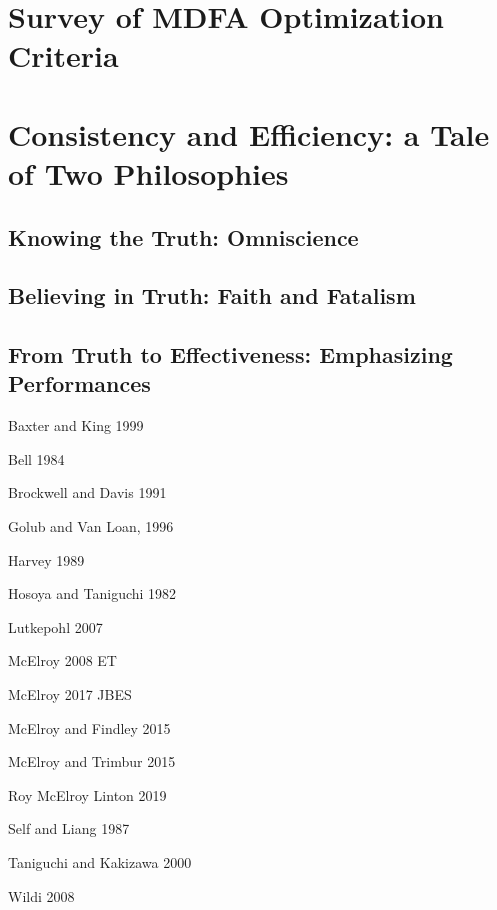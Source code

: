 \documentclass[a4paper]{book}
\begin{document}
\section{Survey of MDFA Optimization Criteria}

\section{Consistency and Efficiency: a Tale of Two Philosophies}

\subsection{Knowing the Truth: Omniscience}

\subsection{Believing in Truth: Faith and Fatalism}

\subsection{From Truth to Effectiveness: Emphasizing Performances}


\begin{thebibliography}{}

\bibitem{} Baxter and King 1999

\bibitem{} Bell 1984

\bibitem{}  Brockwell and Davis 1991

\bibitem{} Golub and Van Loan, 1996

\bibitem{} Harvey 1989

\bibitem{} Hosoya and Taniguchi 1982

\bibitem{}  Lutkepohl 2007

\bibitem{} McElroy 2008 ET

\bibitem{} McElroy 2017 JBES

\bibitem{} McElroy and Findley 2015

\bibitem{} McElroy and Trimbur 2015

\bibitem{} Roy McElroy Linton 2019

\bibitem{} Self and Liang 1987

\bibitem{} Taniguchi and Kakizawa 2000

\bibitem{} Wildi 2008




\end{thebibliography}
\end{document}
